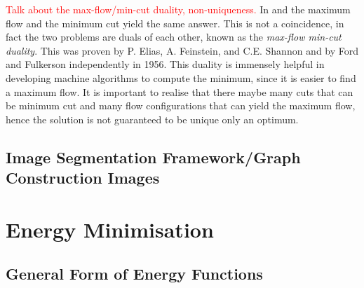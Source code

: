\textcolor{red}{Talk about the max-flow/min-cut duality, non-uniqueness.}
In  and  the maximum flow and the minimum cut yield the same answer. This is not a coincidence, in fact the two problems are duals of each other, known as the \textit{max-flow min-cut duality}. This was proven by P. Elias, A. Feinstein, and C.E. Shannon \citep{Elias1956} and by Ford and Fulkerson \citep{Ford1956} independently in 1956. This duality is immensely helpful in developing machine algorithms to compute the minimum, since it is easier to find a maximum flow. It is important to realise that there maybe many cuts that can be minimum cut and many flow configurations that can yield the maximum flow, hence the solution is not guaranteed to be unique only an optimum.


\subsection{Image Segmentation Framework/Graph Construction Images}
\label{sec:GraphCutFramework}


\section{Energy Minimisation}
\label{sec:EnergyMinimisation}


\subsection{General Form of Energy Functions}
\label{sec:GeneralEnergyFunctions}


